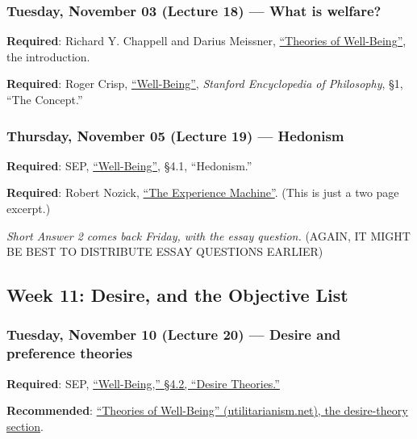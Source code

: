 \documentclass[
  letterpaper,
  DIV=11,
  numbers=noendperiod]{scrartcl}
\begin{document}
\subsubsection{Tuesday, November 03 (Lecture 18) --- What is
welfare?}\label{tuesday-november-03-lecture-18-what-is-welfare}

\textbf{Required}: Richard Y. Chappell and Darius Meissner,
\href{https://www.utilitarianism.net/theories-of-wellbeing}{``Theories
of Well-Being''}, the introduction.

\textbf{Required}: Roger Crisp,
\href{https://plato.stanford.edu/entries/well-being/}{``Well-Being''},
\emph{Stanford Encyclopedia of Philosophy}, §1, ``The Concept.''

\subsubsection{Thursday, November 05 (Lecture 19) ---
Hedonism}\label{thursday-november-05-lecture-19-hedonism}

\textbf{Required}: SEP,
\href{https://plato.stanford.edu/entries/well-being/}{``Well-Being''},
§4.1, ``Hedonism.''

\textbf{Required}: Robert Nozick,
\href{https://rintintin.colorado.edu/~vancecd/phil3160/Nozick1.pdf}{``The
Experience Machine''}. (This is just a two page excerpt.)

\emph{Short Answer 2 comes back Friday, with the essay question.}
(AGAIN, IT MIGHT BE BEST TO DISTRIBUTE ESSAY QUESTIONS EARLIER)

\subsection{Week 11: Desire, and the Objective
List}\label{week-11-desire-and-the-objective-list}

\subsubsection{Tuesday, November 10 (Lecture 20) --- Desire and
preference
theories}\label{tuesday-november-10-lecture-20-desire-and-preference-theories}

\textbf{Required}: SEP,
\href{https://plato.stanford.edu/entries/well-being/}{``Well-Being,''
§4.2, ``Desire Theories.''}

\textbf{Recommended}:
\href{https://utilitarianism.net/theories-of-wellbeing/\#desire-theories}{``Theories
of Well-Being'' (utilitarianism.net), the desire-theory section}.
\end{document}
